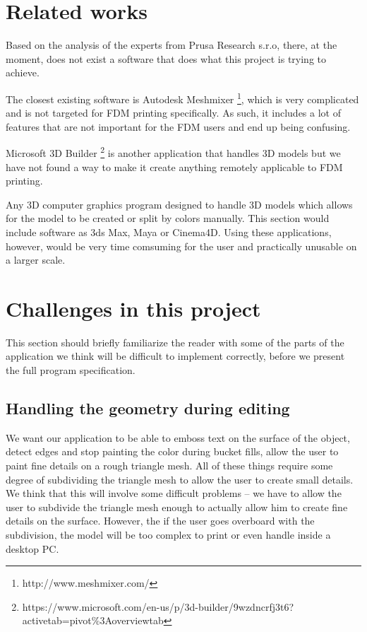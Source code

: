 \section{Related works}

Based on the analysis of the experts from Prusa Research s.r.o, there, at the moment, does not exist a software that does what this project is trying to achieve.

The closest existing software is Autodesk Meshmixer \footnote{http://www.meshmixer.com/}, which is very complicated and is not targeted for FDM printing specifically. As such, it includes a lot of features that are not important for the FDM users and end up being confusing.

Microsoft 3D Builder \footnote{https://www.microsoft.com/en-us/p/3d-builder/9wzdncrfj3t6?activetab=pivot\%3Aoverviewtab} is another application that handles 3D models but we have not found a way to make it create anything remotely applicable to FDM printing.

Any 3D computer graphics program designed to handle 3D models which allows for the model to be created or split by colors manually. This section would include software as 3ds Max, Maya or Cinema4D. Using these applications, however, would be very time comsuming for the user and practically unusable on a larger scale.

\section{Challenges in this project}

This section should briefly familiarize the reader with some of the parts of the application we think will be difficult to implement correctly, before we present the full program specification.

\subsection{Handling the geometry during editing}

We want our application to be able to emboss text on the surface of the object, detect edges and stop painting the color during bucket fills, allow the user to paint fine details on a rough triangle mesh. All of these things require some degree of subdividing the triangle mesh to allow the user to create small details. We think that this will involve some difficult problems -- we have to allow the user to subdivide the triangle mesh enough to actually allow him to create fine details on the surface. However, the if the user goes overboard with the subdivision, the model will be too complex to print or even handle inside a desktop PC.

